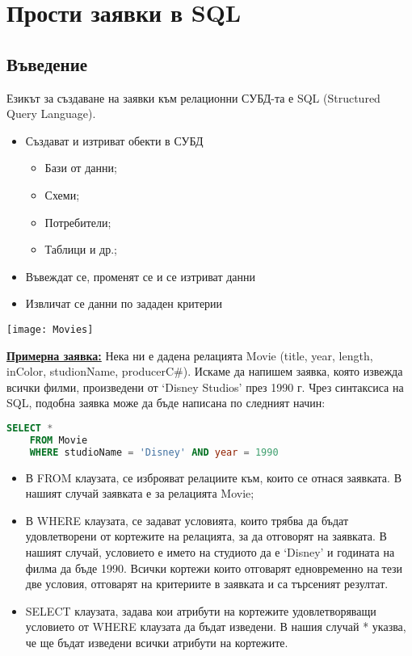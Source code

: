 \section{Прости заявки в SQL}

\subsection{Въведение}
Езикът за създаване на заявки към релационни СУБД-та е SQL (Structured Query Language).

\begin{itemize}
    \item Създават и изтриват обекти в СУБД
\begin{itemize}
    \item Бази от данни;
    \item Схеми;
    \item Потребители;
    \item Таблици и др.;
\end{itemize}
    \item Въвеждат се, променят се и се изтриват данни
    \item Извличат се данни по зададен критерии
\end{itemize}

\begin{center}
    \texttt{[image: Movies]}
\end{center}

\underline{\textbf{Примерна заявка:}}\newline
Нека ни е дадена релацията Movie (title, year, length, inColor, studionName, producerC\#).
Искаме да напишем заявка, която извежда всички филми, произведени от ‘Disney Studios’ през 1990 г.
Чрез синтаксиса на SQL, подобна заявка може да бъде написана по следният начин:

\begin{lstlisting}[language=SQL]
    SELECT *
    FROM Movie
    WHERE studioName = 'Disney' AND year = 1990
\end{lstlisting}

\begin{itemize}
    \item В FROM клаузата, се изброяват релациите към, които се отнася заявката. В нашият
    случай заявката е за релацията Movie;
    \item В WHERE клаузата, се задават условията, които трябва да бъдат удовлетворени от
    кортежите на релацията, за да отговорят на заявката. В нашият случай, условието е
    името на студиото да е ‘Disney’ и годината на филма да бъде 1990. Всички кортежи
    които отговарят едновременно на тези две условия, отговарят на критериите в
    заявката и са търсеният резултат.
    \item SELECT клаузата, задава кои атрибути на кортежите удовлетворяващи условието от
    WHERE клаузата да бъдат изведени. В нашия случай * указва, че ще бъдат изведени
    всички атрибути на кортежите.
\end{itemize}

